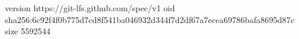version https://git-lfs.github.com/spec/v1
oid sha256:6c92f4f0b775d7cd8f541ba046932d344f7d2df67a7ecea69786bafa8695d87c
size 5592544
